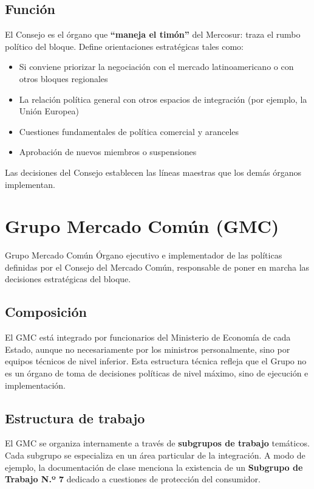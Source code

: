 \documentclass[12pt,oneside]{book}
\begin{document}
\subsection{Función}

El Consejo es el órgano que \textbf{``maneja el timón''} del Mercosur: traza el rumbo político del bloque. Define orientaciones estratégicas tales como:

\begin{itemize}
\item Si conviene priorizar la negociación con el mercado latinoamericano o con otros bloques regionales
\item La relación política general con otros espacios de integración (por ejemplo, la Unión Europea)
\item Cuestiones fundamentales de política comercial y aranceles
\item Aprobación de nuevos miembros o suspensiones
\end{itemize}

Las decisiones del Consejo establecen las líneas maestras que los demás órganos implementan.

\section{Grupo Mercado Común (GMC)}

\begin{definition}{Grupo Mercado Común}
Órgano ejecutivo e implementador de las políticas definidas por el Consejo del Mercado Común, responsable de poner en marcha las decisiones estratégicas del bloque.
\end{definition}

\subsection{Composición}

El GMC está integrado por funcionarios del Ministerio de Economía de cada Estado, aunque no necesariamente por los ministros personalmente, sino por equipos técnicos de nivel inferior. Esta estructura técnica refleja que el Grupo no es un órgano de toma de decisiones políticas de nivel máximo, sino de ejecución e implementación.

\subsection{Estructura de trabajo}

El GMC se organiza internamente a través de \textbf{subgrupos de trabajo} temáticos. Cada subgrupo se especializa en un área particular de la integración. A modo de ejemplo, la documentación de clase menciona la existencia de un \textbf{Subgrupo de Trabajo N.º 7} dedicado a cuestiones de protección del consumidor.
\end{document}
